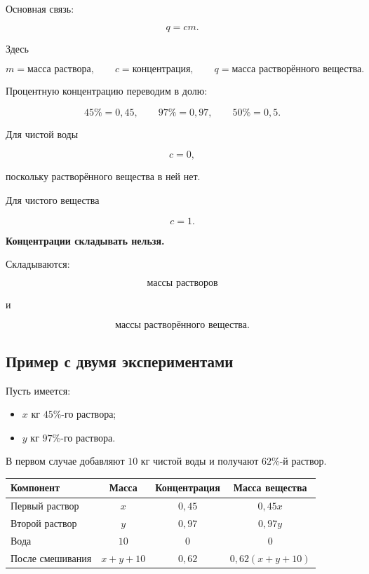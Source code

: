 \documentclass[a4paper,12pt]{article}
\newcommand{\keyidea}[1]{%
  \textcolor{darkaccent}{\textbf{#1}}
}
\begin{document}
Основная связь:

\[
q=cm.
\]

Здесь

\[
m=\text{масса раствора},
\qquad
c=\text{концентрация},
\qquad
q=\text{масса растворённого вещества}.
\]

Процентную концентрацию переводим в долю:

\[
45\%=0{,}45,
\qquad
97\%=0{,}97,
\qquad
50\%=0{,}5.
\]

Для чистой воды

\[
c=0,
\]

поскольку растворённого вещества в ней нет.

Для чистого вещества

\[
c=1.
\]

\keyidea{Концентрации складывать нельзя.}

Складываются:

\[
\text{массы растворов}
\]

и

\[
\text{массы растворённого вещества}.
\]


\subsection*{\color{darkaccent}Пример с двумя экспериментами}

Пусть имеется:

\begin{itemize}
  \item \(x\) кг \(45\%\)-го раствора;
  \item \(y\) кг \(97\%\)-го раствора.
\end{itemize}

В первом случае добавляют \(10\) кг чистой воды и получают \(62\%\)-й раствор.

\begin{table}[ht]
\centering
\begin{tabularx}{0.94\linewidth}{@{}Xccc@{}}
\toprule
\textbf{Компонент}
&
\textbf{Масса}
&
\textbf{Концентрация}
&
\textbf{Масса вещества}
\\
\midrule
Первый раствор
&
\(x\)
&
\(0{,}45\)
&
\(0{,}45x\)
\\
Второй раствор
&
\(y\)
&
\(0{,}97\)
&
\(0{,}97y\)
\\
Вода
&
\(10\)
&
\(0\)
&
\(0\)
\\
После смешивания
&
\(x+y+10\)
&
\(0{,}62\)
&
\(0{,}62(x+y+10)\)
\\
\bottomrule
\end{tabularx}
\end{table}
\end{document}
